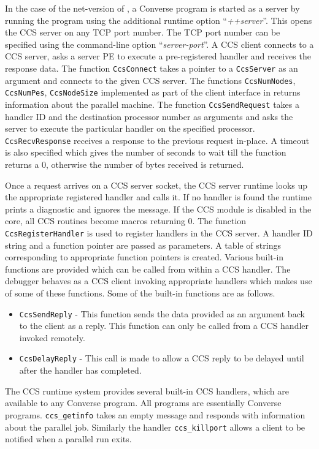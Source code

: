 \documentclass[10pt,dvips]{article}
\begin{document}
In the case of the net-version of \charmpp{}, a Converse program
is started as a server by running the \charmpp{} program using the
additional runtime option ``\textit{++server}''. This opens the CCS
server on any TCP port number. The TCP port number can be
specified using the command-line option ``\textit{server-port}''. A
CCS client connects to a CCS server, asks a server PE to execute a
pre-registered handler and receives the response data. The
function \texttt{CcsConnect} takes a pointer to a
\texttt{CcsServer} as an argument and connects to the given CCS
server. The functions \texttt{CcsNumNodes}, \texttt{CcsNumPes},
\texttt{CcsNodeSize} implemented as part of the client interface
in \charmpp{} returns information about the parallel machine. The
function \texttt{CcsSendRequest} takes a handler ID and the
destination processor number as arguments and asks the server to
execute the particular handler on the specified processor.
\texttt{CcsRecvResponse} receives a response to the previous
request in-place. A timeout is also specified which gives the
number of seconds to wait till the function returns a 0, otherwise
the number of bytes received is returned.

Once a request arrives on a CCS server socket, the CCS server
runtime looks up the appropriate registered handler and calls it.
If no handler is found the runtime prints a diagnostic and ignores
the message. If the CCS module is disabled in the core, all CCS
routines become macros returning 0. The function
\texttt{CcsRegisterHandler} is used to register handlers in the
CCS server. A handler ID string and a function pointer are passed
as parameters. A table of strings corresponding to appropriate
function pointers is created. Various built-in functions are
provided which can be called from within a CCS handler. The
debugger behaves as a CCS client invoking appropriate handlers
which makes use of some of these functions. Some of the built-in
functions are as follows.

\begin{itemize}

\item

\texttt{CcsSendReply} - This function sends the data provided as
an argument back to the client as a reply. This function can only
be called from a CCS handler invoked remotely.

\item

\texttt{CcsDelayReply} - This call is made to allow a CCS reply to
be delayed until after the handler has completed.


\end{itemize}

The CCS runtime system provides several built-in CCS handlers,
which are available to any Converse program. All \charmpp{}
programs are essentially Converse programs. \texttt{ccs\_getinfo}
takes an empty message and responds with information about the
parallel job. Similarly the handler \texttt{ccs\_killport} allows
a client to be notified when a parallel run exits.
\end{document}
